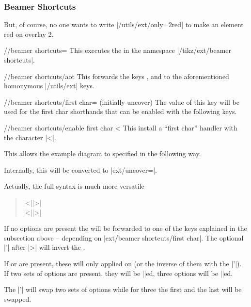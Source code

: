 \subsubsection{Beamer Shortcuts}
But, of course, no one wants to write |/utils/ext/only={2}{red}| to
make an element red on overlay 2.
\begin{key}{/\tikzext/beamer shortcuts=}
  This executes the  in the namespace |/tikz/ext/beamer shortcuts|.
\end{key}
\begin{key}{/\tikzext/beamer shortcuts/aot}
  This forwards the keys , 
  and  to the aforementioned homonymous |/utils/ext| keys.
\end{key}
\begin{key}{/\tikzext/beamer shortcuts/first char=%
   (initially uncover)}
  The value of this key will be used for the first char shorthands that can be enabled with the following keys.
\end{key}
\begin{key}{/\tikzext/beamer shortcuts/enable first char <}
  This install a \enquote{first char} handler with the character |<|.
  
  This allows the example diagram to specified in the following way.
\begin{codeexample}[preamble=\usetikzlibrary{ext.beamer} \setbeamercovered{transparent},code only]
\end{codeexample}

  Internally, this will be converted to |ext/uncover=|.
  
  Actually, the full syntax is much more versatile
  \begin{quote}
      |<||>|\\
      |<||>|
  \end{quote}
  
  If no options are present the  will
  be forwarded to one of the keys explained in the subsection above
  -- depending on |ext/beamer shortcuts/first char|.
  The optional |'| after |>| will invert the .
  
  If  or  are present,
  these will only applied on  (or the inverse of them with the |'|).
  If two sets of options are present, they will be |\alt|ed, three options will be |\temporal|ed.
  
  The |'| will swap two sets of options while for three the first and the last will be swapped.
\end{key}
